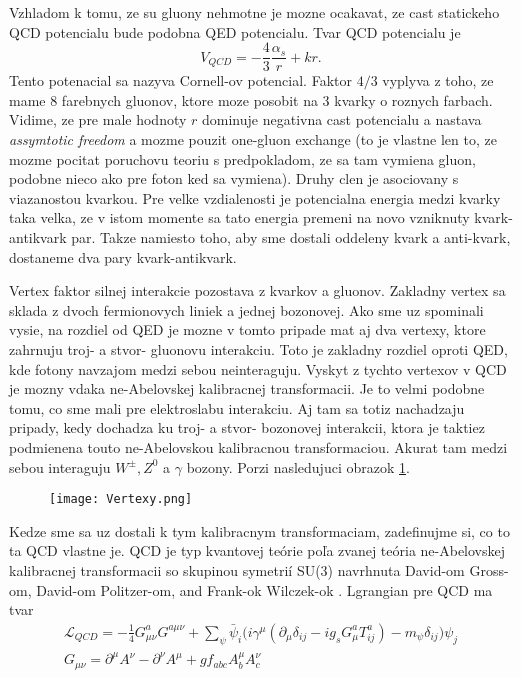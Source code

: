 \documentclass[../../main.tex]{subfiles}
\begin{document}
Vzhladom k tomu, ze su gluony nehmotne je mozne ocakavat, ze cast statickeho QCD potencialu bude podobna QED potencialu. Tvar QCD potencialu je 
$$
V_{QCD}=-\frac{4}{3}\frac{\alpha_s}{r}+kr.
$$ 
Tento potenacial sa nazyva Cornell-ov potencial. Faktor $4/3$ vyplyva z toho, ze mame 8 farebnych gluonov, ktore moze posobit na 3 kvarky o roznych farbach. Vidime, ze pre male hodnoty $r$ dominuje negativna cast potencialu a nastava \textit{assymtotic freedom} a mozme pouzit one-gluon exchange (to je vlastne len to, ze mozme pocitat poruchovu teoriu s predpokladom, ze sa tam vymiena gluon, podobne nieco ako pre foton ked sa vymiena). Druhy clen je asociovany s viazanostou kvarkou. Pre velke vzdialenosti je potencialna energia medzi kvarky taka velka, ze v istom momente sa tato energia premeni na novo vzniknuty kvark-antikvark par. Takze namiesto toho, aby sme dostali oddeleny kvark a anti-kvark, dostaneme dva pary kvark-antikvark.\par
Vertex faktor silnej interakcie pozostava z kvarkov a gluonov. Zakladny vertex sa sklada z dvoch fermionovych liniek a jednej bozonovej. Ako sme uz spominali vysie, na rozdiel od QED je mozne v tomto pripade mat aj dva vertexy, ktore zahrnuju troj- a stvor- gluonovu interakciu. Toto je zakladny rozdiel oproti QED, kde fotony navzajom medzi sebou neinteraguju. Vyskyt z tychto vertexov v QCD je mozny vdaka ne-Abelovskej kalibracnej transformacii. Je to velmi podobne tomu, co sme mali pre elektroslabu interakciu. Aj tam sa totiz nachadzaju pripady, kedy dochadza ku troj- a stvor- bozonovej interakcii, ktora je taktiez podmienena touto ne-Abelovskou kalibracnou transformaciou. Akurat tam medzi sebou interaguju $W^{\pm}, Z^0$ a $ \gamma$ bozony. Porzi nasledujuci obrazok \ref{sf1:ref:vertexy}.
\begin{figure}[!h]
\centering
\texttt{[image: Vertexy.png]}
\caption{}
\label{sf1:ref:vertexy}
\end{figure}
\newline
Kedze sme sa uz dostali k tym kalibracnym transformaciam, zadefinujme si, co to ta QCD vlastne je. QCD je typ kvantovej teórie poľa zvanej teória ne-Abelovskej kalibracnej transformacii so skupinou symetrií SU(3) navrhnuta David-om Gross-om, David-om Politzer-om, and Frank-ok Wilczek-ok . Lgrangian pre 
QCD ma tvar
\begin{equation}
\begin{gathered}
\mathcal{L}_{QCD}=-\frac{1}{4}G^a_{\mu\nu}G^{a\mu\nu}+
\sum_{\psi}\bar{\psi}_i\big(i\gamma^{\mu}(\partial_{\mu}\delta_{ij}-ig_sG_{\mu}^aT_{ij}^a)-m_{\psi}\delta_{ij}\big)\psi_j\\
G_{\mu\nu}=\partial^{\mu}A^{\nu}-\partial^{\nu}A^{\mu}+gf_{abc}A^{\mu}_bA_c^{\nu}
\end{gathered}
\end{equation}
\end{document}
